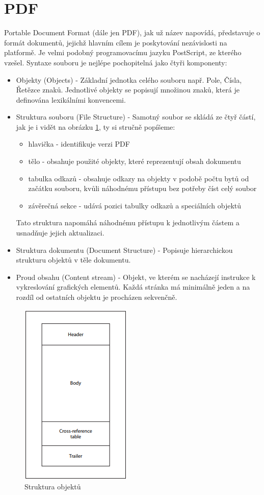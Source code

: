 \section{PDF}
	Portable Document Format (dále jen PDF), jak už název napovídá, představuje o formát dokumentů, jejichž hlavním cílem je poskytování nezávislosti na platformě. Je velmi podobný programovacímu jazyku PostScript, ze kterého vzešel. Syntaxe souboru je nejlépe pochopitelná jako čtyři komponenty\cite{pdf}: 
	\begin{itemize}
		\item Objekty (Objects) - Základní jednotka celého souboru např. Pole, Čísla, Řetězce znaků. Jednotlivé objekty se popisují množinou znaků, která je definována lexikálními konvencemi.
		\item Struktura souboru (File Structure) - Samotný soubor se skládá ze čtyř částí, jak je i vidět na obrázku \ref{fig:pdf}, ty si stručně popíšeme: 
			\begin{itemize}
				\item hlavička - identifikuje verzi PDF
				\item tělo - obsahuje použité objekty, které reprezentují obsah dokumentu
				\item tabulka odkazů - obsahuje odkazy na objekty v podobě počtu bytů od začátku souboru, kvůli náhodnému přístupu bez potřeby číst celý soubor
				\item závěrečná sekce - udává pozici tabulky odkazů a speciálních objektů
			\end{itemize}
		Tato struktura napomáhá náhodnému přístupu k jednotlivým částem a usnadňuje jejich aktualizaci.
		\item Struktura dokumentu (Document Structure) - Popisuje hierarchickou strukturu objektů v těle dokumentu.
		\item Proud obsahu (Content stream) - Objekt, ve kterém se nacházejí instrukce k vykreslování grafických elementů. Každá stránka má minimálně jeden a na rozdíl od ostatních objektu je procházen sekvenčně.	
	\end{itemize}

	\newpage
	\begin{figure}[H]
		\includegraphics[scale=0.9]{Untitled}
		\centering
		\caption{Struktura objektů}
		\label{fig:pdf}
	\end{figure}

